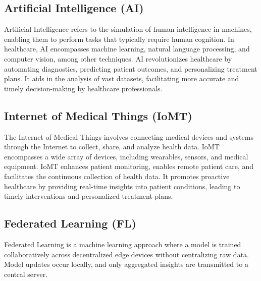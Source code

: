 \documentclass[conference]{IEEEtran}
\begin{document}
\subsection{Artificial Intelligence (AI)}

Artificial Intelligence refers to the simulation of human intelligence in machines, enabling them to perform tasks that typically require human cognition. In healthcare, \cite{9}AI encompasses machine learning, natural language processing, and computer vision, among other techniques. AI revolutionizes healthcare by automating diagnostics, predicting patient outcomes, and personalizing treatment plans. It aids in the analysis of vast datasets, facilitating more accurate and timely decision-making by healthcare professionals.

\subsection{Internet of Medical Things (IoMT)}

The Internet of Medical Things involves connecting medical devices and systems through the Internet to collect, share, and analyze health data. IoMT\cite{1} encompasses a wide array of devices, including wearables, sensors, and medical equipment. IoMT enhances patient monitoring, enables remote patient care, and facilitates the continuous collection of health data. It promotes proactive healthcare by providing real-time insights into patient conditions, leading to timely interventions and personalized treatment plans.

\subsection{Federated Learning (FL)}

Federated Learning is a machine learning approach where a model is trained collaboratively across decentralized edge\cite{3}  devices without centralizing raw data. Model updates occur locally, and only aggregated insights are transmitted to a central server.
\end{document}
